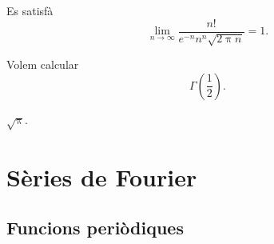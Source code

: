 \documentclass[../../Main.tex]{subfiles}
\begin{document}
	\begin{corollary}
		\label{cor:fórmula d'Stirling}
		Es satisfà
		\[
		    \lim_{n\to\infty}\frac{n!}{e^{-n}n^{n}\sqrt{2\uppi n}}=1.
		\]
	\end{corollary}
	\begin{example}
		Volem calcular
		\[
		    \Gamma\left(\frac{1}{2}\right).
		\]
		\begin{solution}
			\(\sqrt{\uppi}\).
		\end{solution}
	\end{example}
\chapter{Sèries de Fourier}
\section{Funcions periòdiques}
\end{document}
